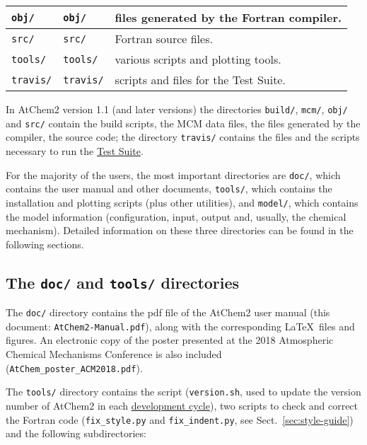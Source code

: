 \begin{table}[htb]
\begin{tabular}{llp{3.7cm}}
    \hline
    \texttt{obj/}                    & \texttt{obj/}                           & files generated by the Fortran compiler.\\
    \hline
    \texttt{src/}                    & \texttt{src/}                           & Fortran source files.\\
    \hline
    \texttt{tools/}                  & \texttt{tools/}                         & various scripts and plotting tools.\\
    \hline
    \texttt{travis/}                 & \texttt{travis/}                        & scripts and files for the Test Suite.\\
  \end{tabular}
\end{table}

In AtChem2 version 1.1 (and later versions) the directories
\texttt{build/}, \texttt{mcm/}, \texttt{obj/} and \texttt{src/}
contain the build scripts, the MCM data files, the files generated by
the compiler, the source code; the directory \texttt{travis/} contains
the files and the scripts necessary to run the
\hyperref[sec:test-suite]{Test Suite}.

For the majority of the users, the most important directories are
\texttt{doc/}, which contains the user manual and other documents,
\texttt{tools/}, which contains the installation and plotting scripts
(plus other utilities), and \texttt{model/}, which contains the model
information (configuration, input, output and, usually, the chemical
mechanism). Detailed information on these three directories can be
found in the following sections.

\subsection{The \texttt{doc/} and \texttt{tools/} directories} \label{subsec:doc-tools-directories}

The \texttt{doc/} directory contains the pdf file of the AtChem2 user
manual (this document: \texttt{AtChem2-Manual.pdf}), along with the
corresponding \LaTeX\ files and figures. An electronic copy of the
poster presented at the 2018 Atmospheric Chemical Mechanisms
Conference \citep{sommariva_2018} is also included
(\texttt{AtChem\_poster\_ACM2018.pdf}).

The \texttt{tools/} directory contains the script
(\texttt{version.sh}, used to update the version number of AtChem2 in
each \hyperref[ch:development]{development cycle}), two scripts to
check and correct the Fortran code (\texttt{fix_style.py} and
\texttt{fix_indent.py}, see Sect.~\ref{sec:style-guide}) and the
following subdirectories:

